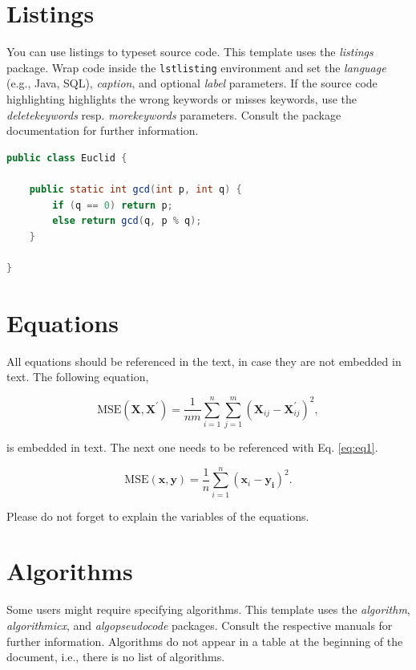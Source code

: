 \section{Listings}
You can use listings to typeset source code. This template uses the \textit{listings} package. Wrap code inside the \texttt{lstlisting} environment and set the \textit{language} (e.g., Java, SQL), \textit{caption}, and optional \textit{label} parameters. If the source code highlighting highlights the wrong keywords or misses keywords, use the \textit{deletekeywords} resp. \textit{morekeywords} parameters. Consult the package documentation for further information.

\begin{lstlisting}[float=htp, caption={Euclid's GCD algorithm implemented in Java}, label={lst:euclid}, language=Java, deletekeywords={}, morekeywords={}]
public class Euclid {

	public static int gcd(int p, int q) {
		if (q == 0) return p;
		else return gcd(q, p % q);
	}

}
\end{lstlisting}

\section{Equations}
All equations should be referenced in the text, in case they are not embedded in text.
The following equation,

\begin{equation}
\text{MSE}(\mathbf{X}, \mathbf{X}^\prime) = \frac{1}{nm} \sum_{i=1}^{n} \sum_{j=1}^{m} (\mathbf{X}_{ij} - \mathbf{X}^\prime_{ij})^2 ,
\end{equation}

is embedded in text. The next one needs to be referenced with Eq. \ref{eq:eq1}.

\begin{equation}
\text{MSE}(\mathbf{x}, \mathbf{y}) = \frac{1}{n} \sum_{i=1}^{n} (\mathbf{x}_{i} - \mathbf{y_i})^2 .
\label{eq:eq1}
\end{equation}

Please do not forget to explain the variables of the equations.

\section{Algorithms}
Some users might require specifying algorithms. This template uses the \textit{algorithm}, \textit{algorithmicx}, and \textit{algopseudocode} packages. Consult the respective manuals for further information. Algorithms do not appear in a table at the beginning of the document, i.e., there is no list of algorithms.

